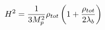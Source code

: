 \begin{equation}
H^2={1 \over 3M_p^2} \rho_{tot} \left(1+{\rho_{tot} \over 2\lambda_b} \right)
\label{mfriedman}
\end{equation}


